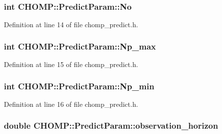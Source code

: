 \subsubsection[{\texorpdfstring{No}{No}}]{\setlength{\rightskip}{0pt plus 5cm}int C\+H\+O\+M\+P\+::\+Predict\+Param\+::\+No}\hypertarget{struct_c_h_o_m_p_1_1_predict_param_a82c7cc8753b178ee7eee3ecb02960651}{}\label{struct_c_h_o_m_p_1_1_predict_param_a82c7cc8753b178ee7eee3ecb02960651}


Definition at line 14 of file chomp\+\_\+predict.\+h.

\subsubsection[{\texorpdfstring{Np\+\_\+max}{Np_max}}]{\setlength{\rightskip}{0pt plus 5cm}int C\+H\+O\+M\+P\+::\+Predict\+Param\+::\+Np\+\_\+max}\hypertarget{struct_c_h_o_m_p_1_1_predict_param_ab35ec9cff6cca550b5ba0b02a9b7b76c}{}\label{struct_c_h_o_m_p_1_1_predict_param_ab35ec9cff6cca550b5ba0b02a9b7b76c}


Definition at line 15 of file chomp\+\_\+predict.\+h.

\subsubsection[{\texorpdfstring{Np\+\_\+min}{Np_min}}]{\setlength{\rightskip}{0pt plus 5cm}int C\+H\+O\+M\+P\+::\+Predict\+Param\+::\+Np\+\_\+min}\hypertarget{struct_c_h_o_m_p_1_1_predict_param_a2f5cf53c69ea584acd95944b4fdd037f}{}\label{struct_c_h_o_m_p_1_1_predict_param_a2f5cf53c69ea584acd95944b4fdd037f}


Definition at line 16 of file chomp\+\_\+predict.\+h.

\subsubsection[{\texorpdfstring{observation\+\_\+horizon}{observation_horizon}}]{\setlength{\rightskip}{0pt plus 5cm}double C\+H\+O\+M\+P\+::\+Predict\+Param\+::observation\+\_\+horizon}\hypertarget{struct_c_h_o_m_p_1_1_predict_param_ac11faa559b419145302aea082ded610e}{}\label{struct_c_h_o_m_p_1_1_predict_param_ac11faa559b419145302aea082ded610e}


